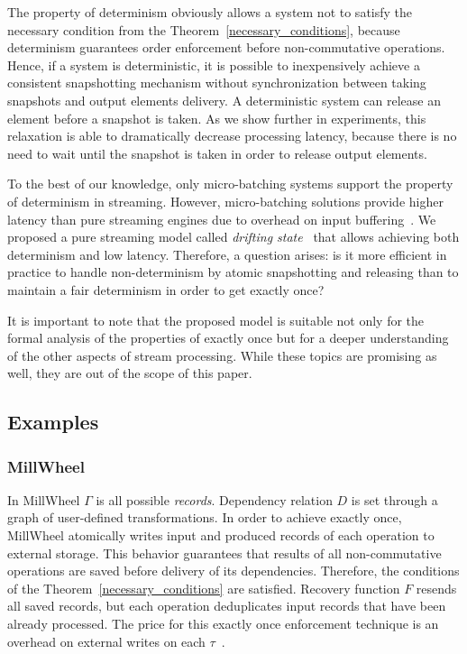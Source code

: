 The property of determinism obviously allows a system not to satisfy the necessary condition from the Theorem~\ref{necessary_conditions}, because determinism guarantees order enforcement before non-commutative operations. Hence, if a system is deterministic, it is possible to inexpensively achieve a consistent snapshotting mechanism without synchronization between taking snapshots and output elements delivery. A deterministic system can release an element before a snapshot is taken. As we show further in experiments, this relaxation is able to dramatically decrease processing latency, because there is no need to wait until the snapshot is taken in order to release output elements.

To the best of our knowledge, only micro-batching systems support the property of determinism in streaming. However, micro-batching solutions provide higher latency than pure streaming engines due to overhead on input buffering~\cite{karimov2018benchmarking}. We proposed a pure streaming model called {\em drifting state}~\cite{we2018adbis} that allows achieving both determinism and low latency. Therefore, a question arises: is it more efficient in practice to handle non-determinism by atomic snapshotting and releasing than to maintain a fair determinism in order to get exactly once? 

It is important to note that the proposed model is suitable not only for the formal analysis of the properties of exactly once but for a deeper understanding of the other aspects of stream processing. While these topics are promising as well, they are out of the scope of this paper.

\subsection{Examples}

\subsubsection{MillWheel}

In MillWheel $\Gamma$ is all possible {\em records}. Dependency relation $D$ is set through a graph of user-defined transformations. In order to achieve exactly once, MillWheel atomically writes input and produced records of each operation to external storage. This behavior guarantees that results of all non-commutative operations are saved before delivery of its dependencies. Therefore, the conditions of the Theorem~\ref{necessary_conditions} are satisfied. Recovery function $F$ resends all saved records, but each operation deduplicates input records that have been already processed. The price for this exactly once enforcement technique is an overhead on external writes on each $\tau$~\cite{Akidau:2013:MFS:2536222.2536229}.    

